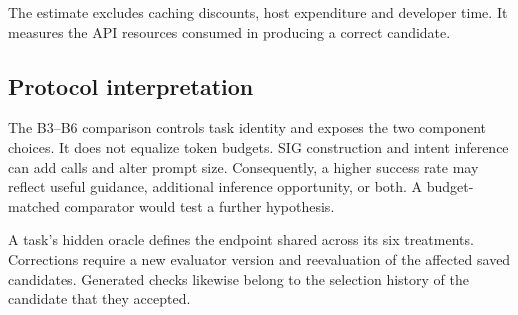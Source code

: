 The estimate excludes caching discounts, host expenditure and developer time. It measures the API resources consumed in producing a correct candidate.

\ifAccess
\subsection{Protocol interpretation}
The B3--B6 comparison controls task identity and exposes the two component choices. It does not equalize token budgets. SIG construction and intent inference can add calls and alter prompt size. Consequently, a higher success rate may reflect useful guidance, additional inference opportunity, or both. A budget-matched comparator would test a further hypothesis.

A task's hidden oracle defines the endpoint shared across its six treatments. Corrections require a new evaluator version and reevaluation of the affected saved candidates. Generated checks likewise belong to the selection history of the candidate that they accepted.
\fi
